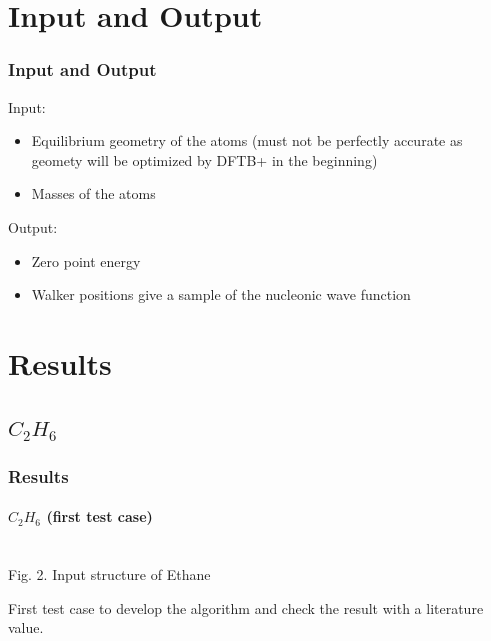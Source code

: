 \documentclass{beamer}
\begin{document}
\section{Input and Output}
\begin{frame}
\frametitle{Input and Output}
Input:\\
\begin{itemize}
\item Equilibrium geometry of the atoms (must not be perfectly accurate as geomety will be optimized by DFTB+ in the beginning)
\item Masses of the atoms
\end{itemize}
Output:
\begin{itemize}
\item Zero point energy
\item Walker positions give a sample of the nucleonic wave function
\end{itemize}
\end{frame}

\section{Results}

\subsection{$C_2 H_6$}
\begin{frame}
\frametitle{Results}
\framesubtitle{$C_2 H_6$ (first test case)}
\begin{center}
\\
Fig. 2. Input structure of Ethane
\end{center}
First test case to develop the algorithm and check the result with a literature value.
\end{frame}
\end{document}
